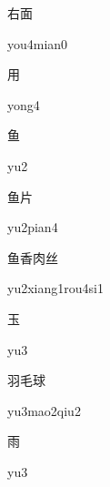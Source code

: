 \begin{verbete}{右面}
\begin{pronuncia}{you4mian0}
\end{pronuncia}
\end{verbete}

\begin{verbete}[yong4]{用}
\begin{pronuncia}{yong4}
\end{pronuncia}
\end{verbete}

\begin{verbete}[yu2]{鱼}
\begin{pronuncia}{yu2}
\end{pronuncia}
\end{verbete}

\begin{verbete}[yu2pian4]{鱼片}
\begin{pronuncia}{yu2pian4}
\end{pronuncia}
\end{verbete}

\begin{verbete}{鱼香肉丝}
\begin{pronuncia}{yu2xiang1rou4si1}
\end{pronuncia}
\end{verbete}

\begin{verbete}[yu3]{玉}
\begin{pronuncia}{yu3}
\end{pronuncia}
\end{verbete}

\begin{verbete}{羽毛球}
\begin{pronuncia}{yu3mao2qiu2}
\end{pronuncia}
\end{verbete}

\begin{verbete}[yu3]{雨}
\begin{pronuncia}{yu3}
\end{pronuncia}
\end{verbete}

